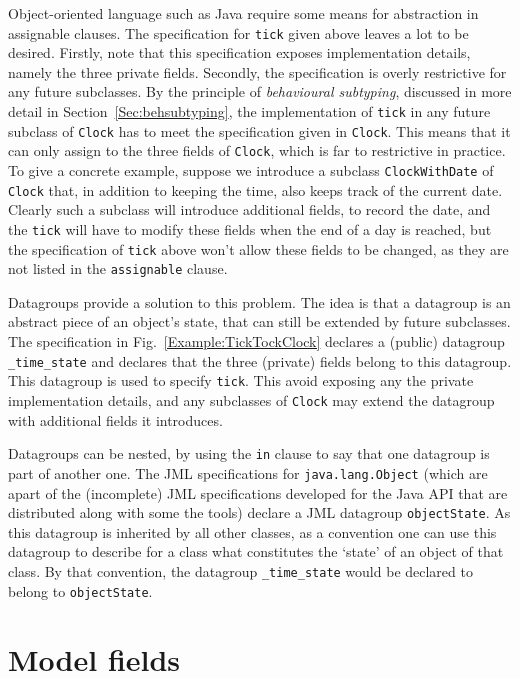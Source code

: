 \documentclass{llncs}
\begin{document}
Object-oriented language such as Java require some means for abstraction in 
assignable clauses.
The specification for \texttt{tick} given above leaves a lot to be desired.
Firstly, note that this specification exposes implementation details,
namely the three private fields.
Secondly, the specification is overly restrictive for any future subclasses.
By the principle of \emph{behavioural subtyping}, discussed in more detail
in Section~\ref{Sec:behsubtyping}, the implementation of \texttt{tick} in any future
subclass of \texttt{Clock} has to meet the specification given in \texttt{Clock}.
This means that it can only assign to the three fields of \texttt{Clock},
which is far to restrictive in practice.
To give a concrete example, suppose we introduce a subclass \texttt{ClockWithDate} 
of \texttt{Clock} that, in addition to keeping the time, also keeps track of the 
current date.  Clearly such a subclass will introduce additional fields, to record 
the date, and the \texttt{tick} will have to modify these fields when the end
of a day is reached,  but the specification of \texttt{tick} above won't allow 
these fields to be changed, as they are not listed in the \texttt{assignable} clause.

Datagroups \cite{Leino98} provide a solution to 
this problem. The idea is that a datagroup is an abstract piece of an object's
state, that can still be extended by future subclasses.
The specification in Fig.~\ref{Example:TickTockClock} declares a (public) datagroup
\texttt{\_time\_state} and declares that the three (private) fields belong
to this datagroup. This datagroup is used to specify \texttt{tick}.
This avoid exposing any the private implementation details, and
any subclasses of \texttt{Clock} may extend the datagroup with
additional fields it introduces.

Datagroups can be nested, by using the \texttt{in} clause to say that
one datagroup is part of another one. The JML specifications for
\texttt{java.lang.Object} (which are apart of the (incomplete) JML 
specifications developed for the Java API that are distributed along with 
some the tools) declare a JML datagroup \texttt{objectState}. As this datagroup
is inherited by all other classes, as a convention one can use this datagroup 
to describe for a class what constitutes the `state' of an object of that class.
By that convention, the datagroup \texttt{\_time\_state} would be declared
to belong to \texttt{objectState}.

\section{Model fields}
\label{Sec:model}
\end{document}
